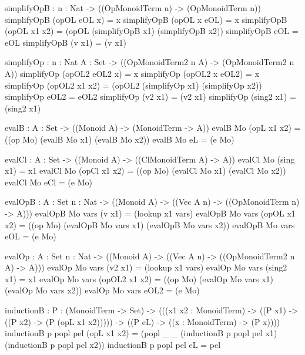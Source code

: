\begin{togcode}     
  simplifyOpB : {n : Nat} -> ((OpMonoidTerm n) -> (OpMonoidTerm n))
  simplifyOpB (opOL eOL x) = x 
  simplifyOpB (opOL x eOL) = x 
  simplifyOpB (opOL x1 x2) = (opOL (simplifyOpB x1) (simplifyOpB x2)) 
  simplifyOpB eOL = eOL 
  simplifyOpB (v x1) = (v x1) 

  simplifyOp : {n : Nat} {A : Set} -> 
      ((OpMonoidTerm2 n A) -> (OpMonoidTerm2 n A))
  simplifyOp (opOL2 eOL2 x) = x 
  simplifyOp (opOL2 x eOL2) = x 
  simplifyOp (opOL2 x1 x2) = (opOL2 (simplifyOp x1) (simplifyOp x2)) 
  simplifyOp eOL2 = eOL2 
  simplifyOp (v2 x1) = (v2 x1) 
  simplifyOp (sing2 x1) = (sing2 x1) 

  evalB : {A : Set} -> ((Monoid A) -> (MonoidTerm -> A))
  evalB Mo (opL x1 x2) = ((op Mo) (evalB Mo x1) (evalB Mo x2)) 
  evalB Mo eL = (e Mo) 
  
  evalCl : {A : Set} -> ((Monoid A) -> ((ClMonoidTerm A) -> A))
  evalCl Mo (sing x1) = x1 
  evalCl Mo (opCl x1 x2) = ((op Mo) (evalCl Mo x1) (evalCl Mo x2)) 
  evalCl Mo eCl = (e Mo) 
\end{togcode}
\begin{togcode}    
  evalOpB : {A : Set} {n : Nat} -> 
      ((Monoid A) -> ((Vec A n) -> ((OpMonoidTerm n) -> A)))
  evalOpB Mo vars (v x1) = (lookup x1 vars) 
  evalOpB Mo vars (opOL x1 x2) = 
    ((op Mo) (evalOpB Mo vars x1) (evalOpB Mo vars x2)) 
  evalOpB Mo vars eOL = (e Mo) 

  evalOp : {A : Set} {n : Nat} -> 
      ((Monoid A) -> ((Vec A n) -> ((OpMonoidTerm2 n A) -> A)))
  evalOp Mo vars (v2 x1) = (lookup x1 vars) 
  evalOp Mo vars (sing2 x1) = x1 
  evalOp Mo vars (opOL2 x1 x2) = 
    ((op Mo) (evalOp Mo vars x1) (evalOp Mo vars x2)) 
  evalOp Mo vars eOL2 = (e Mo) 
 
  inductionB : {P : (MonoidTerm -> Set)} -> 
    (((x1 x2 : MonoidTerm) -> ((P x1) -> ((P x2) -> (P (opL x1 x2))))) -> 
    ((P eL) -> ((x : MonoidTerm) -> (P x))))
  inductionB {p} popl pel (opL x1 x2) = 
    (popl _ _ (inductionB {p} popl pel x1) (inductionB {p} popl pel x2)) 
  inductionB {p} popl pel eL = pel 
\end{togcode}                  
